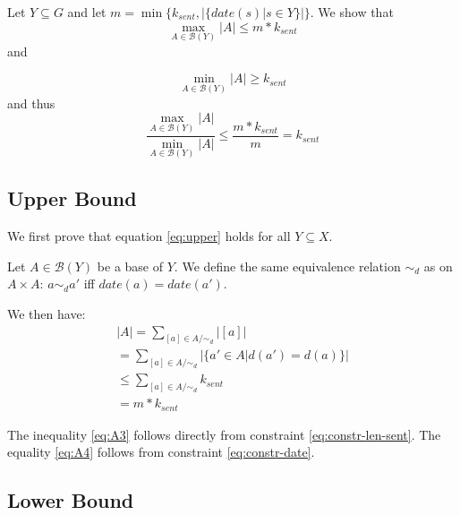 \documentclass[a4paper,BCOR=10mm]{report}
\numberwithin{lemma}{chapter}
\numberwithin{definition}{chapter}
\begin{document}
\begin{appendices}
Let $Y \subseteq G$ and let $m = \min \{ k_{sent}, |\{\mathit{date}(s) | s \in Y\}| \}$.
We show that 
\begin{equation}
\max_{A \in \mathcal{B}(Y)} |A| \leq m * k_{sent} \label{eq:upper}
\end{equation}
 and

\begin{equation}
\min_{A \in \mathcal{B}(Y)} |A| \geq k_{sent} \label{eq:lower}
\end{equation}
and thus 
\begin{equation}
\frac{\max_{A \in \mathcal{B}(Y)} |A|}{\min_{A \in \mathcal{B}(Y)} |A|}
\leq \frac{m * k_{sent}}{m} = k_{sent}    
\end{equation}

\subsection{Upper Bound} \label{sec:cluster-upper-bound}

We first prove that equation \ref{eq:upper} holds for all $Y \subseteq X$.

Let $A \in \mathcal{B}(Y)$ be a base of $Y$. We define the same equivalence relation $\sim_d$ as \citeauthor{markert} on $A \times A$:
$a \sim_d a'$ iff $\mathit{date}(a) = \mathit{date}(a')$.

We then have:
\begin{align}
|A| = \sum_{[a] \in A/\sim_d} |[a]| \\
    = \sum_{[a] \in A/\sim_d} |\{ a' \in A | d(a') = d(a) \}| \label{eq:A2} \\
    \leq \sum_{[a] \in A/\sim_d} k_{sent} \label{eq:A3} \\
    = m * k_{sent} \label{eq:A4}
\end{align}

The inequality \ref{eq:A3} follows directly from constraint \ref{eq:constr-len-sent}.
The equality \ref{eq:A4} follows from constraint \ref{eq:constr-date}.


\subsection{Lower Bound} \label{sec:proof-date-lower}


\end{appendices}
\end{document}
